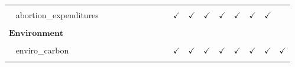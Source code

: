 \documentclass[
  12pt]{article}
\begin{document}
\begin{table}[H]
{\begin{tabular}{lcccccccccccccccc}
\cellcolor{gray!6}{$\hspace{10pt}$abortion\_coverage} & \cellcolor{gray!6}{} & \cellcolor{gray!6}{} & \cellcolor{gray!6}{} & \cellcolor{gray!6}{} & \cellcolor{gray!6}{} & \cellcolor{gray!6}{} & \cellcolor{gray!6}{} & \cellcolor{gray!6}{} & \cellcolor{gray!6}{$\checkmark$} & \cellcolor{gray!6}{$\checkmark$} & \cellcolor{gray!6}{$\checkmark$} & \cellcolor{gray!6}{$\checkmark$} & \cellcolor{gray!6}{$\checkmark$} & \cellcolor{gray!6}{} & \cellcolor{gray!6}{$\checkmark$} & \cellcolor{gray!6}{}\\
$\hspace{10pt}$abortion\_expenditures &  &  &  &  &  &  &  &  & $\checkmark$ & $\checkmark$ & $\checkmark$ & $\checkmark$ & $\checkmark$ & $\checkmark$ & $\checkmark$ & \\
\cellcolor{gray!6}{$\hspace{10pt}$abortion\_prohibition} & \cellcolor{gray!6}{} & \cellcolor{gray!6}{} & \cellcolor{gray!6}{} & \cellcolor{gray!6}{} & \cellcolor{gray!6}{} & \cellcolor{gray!6}{} & \cellcolor{gray!6}{} & \cellcolor{gray!6}{} & \cellcolor{gray!6}{} & \cellcolor{gray!6}{$\checkmark$} & \cellcolor{gray!6}{$\checkmark$} & \cellcolor{gray!6}{$\checkmark$} & \cellcolor{gray!6}{$\checkmark$} & \cellcolor{gray!6}{$\checkmark$} & \cellcolor{gray!6}{$\checkmark$} & \cellcolor{gray!6}{$\checkmark$}\\
$\textbf{Environment}$ &  &  &  &  &  &  &  &  &  &  &  &  &  &  &  & \\
\cellcolor{gray!6}{$\hspace{10pt}$enviro\_scale} & \cellcolor{gray!6}{$\checkmark$} & \cellcolor{gray!6}{$\checkmark$} & \cellcolor{gray!6}{} & \cellcolor{gray!6}{$\checkmark$} & \cellcolor{gray!6}{$\checkmark$} & \cellcolor{gray!6}{$\checkmark$} & \cellcolor{gray!6}{$\checkmark$} & \cellcolor{gray!6}{} & \cellcolor{gray!6}{} & \cellcolor{gray!6}{} & \cellcolor{gray!6}{} & \cellcolor{gray!6}{} & \cellcolor{gray!6}{} & \cellcolor{gray!6}{} & \cellcolor{gray!6}{} & \cellcolor{gray!6}{}\\
$\hspace{10pt}$enviro\_carbon &  &  &  &  &  &  &  &  & $\checkmark$ & $\checkmark$ & $\checkmark$ & $\checkmark$ & $\checkmark$ & $\checkmark$ & $\checkmark$ & $\checkmark$\\
\cellcolor{gray!6}{$\hspace{10pt}$enviro\_mpg\_raise} & \cellcolor{gray!6}{} & \cellcolor{gray!6}{} & \cellcolor{gray!6}{} & \cellcolor{gray!6}{} & \cellcolor{gray!6}{} & \cellcolor{gray!6}{} & \cellcolor{gray!6}{} & \cellcolor{gray!6}{} & \cellcolor{gray!6}{$\checkmark$} & \cellcolor{gray!6}{$\checkmark$} & \cellcolor{gray!6}{$\checkmark$} & \cellcolor{gray!6}{$\checkmark$} & \cellcolor{gray!6}{} & \cellcolor{gray!6}{} & \cellcolor{gray!6}{$\checkmark$} & \cellcolor{gray!6}{$\checkmark$}\\

\end{tabular}}
\end{table}
\end{document}
